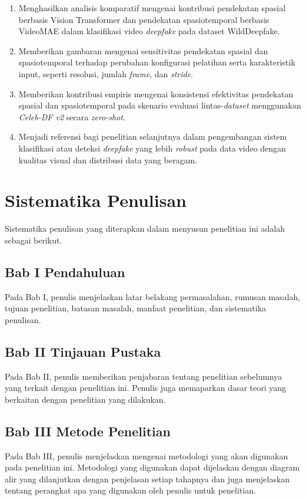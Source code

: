 \begin{enumerate}[noitemsep]
	\item Menghasilkan analisis komparatif mengenai kontribusi pendekatan spasial berbasis Vision Transformer dan pendekatan spasiotemporal berbasis VideoMAE dalam klasifikasi video \textit{deepfake} pada dataset WildDeepfake.
	\item Memberikan gambaran mengenai sensitivitas pendekatan spasial dan spasiotemporal terhadap perubahan konfigurasi pelatihan serta karakteristik input, seperti resolusi, jumlah \textit{frame}, dan \textit{stride}.
	\item Memberikan kontribusi empiris mengenai konsistensi efektivitas pendekatan spasial dan spasiotemporal pada skenario evaluasi lintas-\textit{dataset} menggunakan \textit{Celeb-DF v2} secara \textit{zero-shot}.
	\item Menjadi referensi bagi penelitian selanjutnya dalam pengembangan sistem klasifikasi atau deteksi \textit{deepfake} yang lebih \textit{robust} pada data video dengan kualitas visual dan distribusi data yang beragam.
\end{enumerate}


\section{Sistematika Penulisan} \label{I.Sistematika}
Sistematika penulisan yang diterapkan dalam menyusun penelitian ini adalah sebagai berikut. \par

\subsection{Bab I Pendahuluan}
Pada Bab I, penulis menjelaskan latar belakang permasalahan, rumusan masalah, tujuan penelitian, batasan masalah, manfaat penelitian, dan sistematika penulisan. \par

\subsection{Bab II Tinjauan Pustaka}
Pada Bab II, penulis memberikan penjabaran tentang penelitian sebelumnya yang terkait dengan penelitian ini. Penulis juga memaparkan dasar teori yang berkaitan dengan penelitian yang dilakukan. \par

\subsection{Bab III Metode Penelitian}
Pada Bab III, penulis menjelaskan mengenai metodologi yang akan digunakan pada penelitian ini. Metodologi yang digunakan dapat dijelaskan dengan diagram alir yang dilanjutkan dengan penjelasan setiap tahapnya dan juga menjelaskan tentang perangkat apa yang digunakan oleh penulis untuk penelitian. \par

